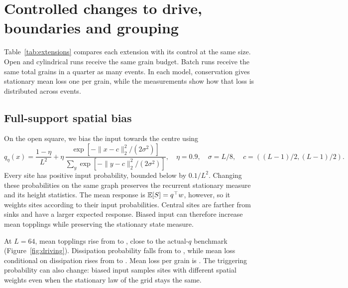 \section{Controlled changes to drive, boundaries and grouping}\label{sec:extensions}
Table~\ref{tab:extensions} compares each extension with its control at the same size. Open and cylindrical runs receive the same grain budget. Batch runs receive the same total grains in a quarter as many events. In each model, conservation gives stationary mean loss one per grain, while the measurements show how that loss is distributed across events.

\begin{table}[!htbp]
\centering\small\setlength{\tabcolsep}{3.6pt}

\caption{Primary comparisons at matched sizes, with five seeds and one million production grains per row. Mean height and topplings per grain include 95\% seed half-widths. Probabilities and conditional loss use single-grain events for the first three rows at each $L$ and four-grain events for batches. Batch mean loss is near four per event and one per grain. The summary CSV retains full probability and loss intervals and height frequencies. Batch estimates are paired with baseline.}
\label{tab:extensions}
\end{table}

\subsection{Full-support spatial bias}\label{sec:bias}
On the open square, we bias the input towards the centre using
\begin{equation}
 q_\eta(x)=\frac{1-\eta}{L^2}+\eta\,
 \frac{\exp[-\|x-c\|_2^2/(2\sigma^2)]}{\sum_y\exp[-\|y-c\|_2^2/(2\sigma^2)]},
 \quad \eta=0.9,\quad\sigma=L/8,\quad c=((L-1)/2,(L-1)/2).
\end{equation}
Every site has positive input probability, bounded below by $0.1/L^2$. Changing these probabilities on the same graph preserves the recurrent stationary measure and its height statistics. The mean response is $\mathbb E[S]=q^\top w$, however, so it weights sites according to their input probabilities. Central sites are farther from sinks and have a larger expected response. Biased input can therefore increase mean topplings while preserving the stationary state measure.

At $L=64$, mean topplings rise from  to , close to the actual-$q$ benchmark  (Figure~\ref{fig:driving}). Dissipation probability falls from  to , while mean loss conditional on dissipation rises from  to . Mean loss per grain is . The triggering probability can also change: biased input samples sites with different spatial weights even when the stationary law of the grid stays the same.

